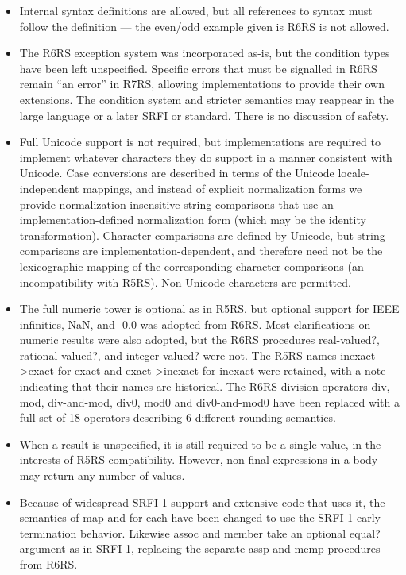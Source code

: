 \begin{itemize}
\item Internal syntax definitions are allowed, but all references to syntax
must follow the definition --- the {\cf even}/{\cf odd} example given is
R6RS is not allowed.

\item The R6RS exception system was incorporated as-is, but the condition
types have been left unspecified. Specific errors that must be signalled
in R6RS remain ``an error'' in R7RS, allowing implementations to provide
their own extensions.  The condition system and stricter semantics may
reappear in the large language or a later SRFI or standard. There is no
discussion of safety.

\item Full Unicode support is not required, but implementations are required to
implement whatever characters they do support in a manner
consistent with Unicode.  Case
conversions are described in terms of the Unicode locale-independent
mappings, and instead of explicit normalization forms we provide 
normalization-insensitive string comparisons that use
an implementation-defined normalization form
(which may be the identity transformation). Character comparisons are
defined by Unicode, but string comparisons are implementation-dependent,
and therefore need not be the lexicographic mapping of the corresponding
character comparisons (an incompatibility with R5RS). Non-Unicode
characters are permitted.

\item The full numeric tower is optional as in R5RS, but optional support for IEEE
infinities, NaN, and -0.0 was adopted from R6RS. Most clarifications on
numeric results were also adopted, but the R6RS procedures {\cf real-valued?},
{\cf rational-valued?}, and {\cf integer-valued}? were not. The R5RS names
{\cf inexact->exact} for {\cf exact} and {\cf exact->inexact} for {\cf inexact} were retained,
with a note indicating that their names are historical.
The R6RS division operators {\cf div}, {\cf mod}, {\cf div-and-mod}, {\cf
div0}, {\cf mod0} and {\cf div0-and-mod0} have been replaced with a full
set of 18 operators describing 6 different rounding semantics.

\item When a result is unspecified, it is still required to be a single value,
in the interests of R5RS compatibility. However, non-final expressions
in a body may return any number of values.

\item Because of widespread SRFI 1 support and extensive code
that uses it, the semantics of {\cf map} and {\cf for-each} have been changed to use
the SRFI 1 early termination behavior. Likewise
{\cf assoc} and {\cf member} take an optional {\cf equal?} argument as in SRFI 1,
replacing the separate {\cf assp} and {\cf memp} procedures from R6RS.


\end{itemize}
